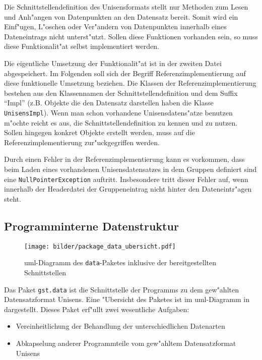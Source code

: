 Die Schnittstellendefinition des Unisensformats stellt nur Methoden zum Lesen und Anh"angen von Datenpunkten an den Datensatz bereit.
Somit wird ein Einf"ugen, L"oschen oder Ver"andern von Datenpunkten innerhalb eines Dateneintrags nicht unterst"utzt.
Sollen diese Funktionen vorhanden sein, so muss diese Funktionalit"at selbst implementiert werden.

Die eigentliche Umsetzung der Funktionalit"at ist in der zweiten Datei abgespeichert.
Im Folgenden soll sich der Begriff Referenzimplementierung auf diese funktionelle Umsetzung beziehen.
Die Klassen der Referenzimplementierung bestehen aus den Klassennamen der Schnittstellendefinition und dem Suffix "`Impl"' (z.B. Objekte die den Datensatz darstellen haben die Klasse \verb|UnisensImpl|).
Wenn man schon vorhandene Unisensdatens"atze benutzen m"ochte reicht es aus, die Schnittstellendefinition zu kennen und zu nutzen.
Sollen hingegen konkret Objekte erstellt werden, muss auf die Referenzimplementierung zur"uckgegriffen werden.

Durch einen Fehler in der Referenzimplementierung kann es vorkommen, dass beim Laden eines vorhandenen Unisensdatensatzes in dem Gruppen definiert sind eine \verb|NullPointerException| auftritt.
Insbesondere tritt dieser Fehler auf, wenn innerhalb der Headerdatei der Gruppeneintrag nicht hinter den Dateneintr"agen steht.

\subsection{Programminterne Datenstruktur}

\begin{figure}[htb]
\centering
\texttt{[image: bilder/package\_data\_ubersicht.pdf]}
\caption[\acs{uml}-Diagramm des \texttt{data}-Paketes]{\ac{uml}-Diagramm des \texttt{data}-Paketes inklusive der bereitgestellten Schnittstellen}
\label{pic:data_package}
\end{figure}

Das Paket \verb|gst.data| ist die Schnittstelle der Programms zu dem gew"ahlten Datensatzformat Unisens.
Eine "Ubersicht des Paketes ist im \ac{uml}-Diagramm in  dargestellt.
Dieses Paket erf"ullt zwei wesentliche Aufgaben:
\begin{itemize}
	\item Vereinheitlichung der Behandlung der unterschiedlichen Datenarten
	\item Abkapselung anderer Programmteile vom gew"ahltem Datensatzformat Unisens
\end{itemize}

